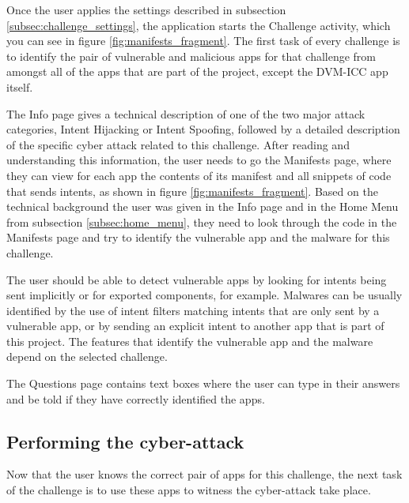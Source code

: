     Once the user applies the settings described in subsection \ref{subsec:challenge_settings}, the application starts the Challenge activity, which you can see in figure \ref{fig:manifests_fragment}. The first task of every challenge is to identify the pair of vulnerable and malicious apps for that challenge from amongst all of the apps that are part of the project, except the DVM-ICC app itself. 
    
    The Info page gives a technical description of one of the two major attack categories, Intent Hijacking or Intent Spoofing, followed by a detailed description of the specific cyber attack related to this challenge. After reading and understanding this information, the user needs to go the Manifests page, where they can view for each app the contents of its manifest and all snippets of code that sends intents, as shown in figure \ref{fig:manifests_fragment}. Based on the technical background the user was given in the Info page and in the Home Menu from subsection \ref{subsec:home_menu}, they need to look through the code in the Manifests page and try to identify the vulnerable app and the malware for this challenge. 
    
    The user should be able to detect vulnerable apps by looking for intents being sent implicitly or for exported components, for example. Malwares can be usually identified by the use of intent filters matching intents that are only sent by a vulnerable app, or by sending an explicit intent to another app that is part of this project. The features that identify the vulnerable app and the malware depend on the selected challenge.
    
    The Questions page contains text boxes where the user can type in their answers and be told if they have correctly identified the apps.
    
    \subsection{Performing the cyber-attack}
        \label{subsec:perform_attack}
        
    Now that the user knows the correct pair of apps for this challenge, the next task of the challenge is to use these apps to witness the cyber-attack take place.
    
